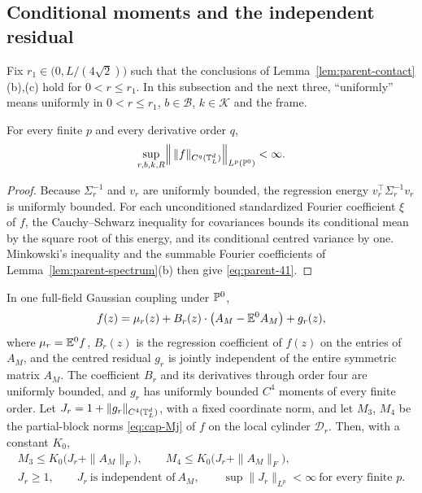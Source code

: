 \subsection{Conditional moments and the independent residual}\label{ssec:parent-residual}

Fix $r_1\in\bigl(0,L/(4\sqrt2)\bigr)$ such that the conclusions of Lemma~\ref{lem:parent-contact}(b),(c) hold for $0<r\le r_1$. In this subsection and the next three, ``uniformly'' means uniformly in $0<r\le r_1$, $b\in\mathcal B$, $k\in\mathcal K$ and the frame.

\begin{lemma}\label{lem:parent-moments}
For every finite $p$ and every derivative order $q$,
\begin{equation}\label{eq:parent-41}
\sup_{r,b,k,R}\Bigl\|\,\|f\|_{C^q(\mathbb T^d_L)}\Bigr\|_{L^p(\mathbb P^0)}<\infty .
\end{equation}
\end{lemma}

\begin{proof}
Because $\Sigma_r^{-1}$ and $v_r$ are uniformly bounded, the regression energy $v_r^{\top}\Sigma_r^{-1}v_r$ is uniformly bounded. For each unconditioned standardized Fourier coefficient $\xi$ of $f$, the Cauchy--Schwarz inequality for covariances bounds its conditional mean by the square root of this energy, and its conditional centred variance by one. Minkowski's inequality and the summable Fourier coefficients of Lemma~\ref{lem:parent-spectrum}(b) then give \eqref{eq:parent-41}.
\end{proof}

\begin{lemma}\label{lem:parent-residual}
In one full-field Gaussian coupling under $\mathbb P^0$,
\begin{equation}\label{eq:parent-42}
f(z)=\mu_r(z)+B_r(z)\cdot\bigl(A_M-\mathbb E^0A_M\bigr)+g_r(z),
\end{equation}
where $\mu_r=\mathbb E^0f$, $B_r(z)$ is the regression coefficient of $f(z)$ on the entries of $A_M$, and the centred residual $g_r$ is jointly independent of the entire symmetric matrix $A_M$. The coefficient $B_r$ and its derivatives through order four are uniformly bounded, and $g_r$ has uniformly bounded $C^4$ moments of every finite order. Let $J_r=1+\|g_r\|_{C^4(\mathbb T^d_L)}$, with a fixed coordinate norm, and let $M_3$, $M_4$ be the partial-block norms \eqref{eq:cap-Mj} of $f$ on the local cylinder $\mathcal D_r$. Then, with a constant $K_0$,
\begin{equation}\label{eq:parent-43}
\begin{gathered}
M_3\le K_0\bigl(J_r+\|A_M\|_F\bigr),\qquad M_4\le K_0\bigl(J_r+\|A_M\|_F\bigr),\\
J_r\ge1,\qquad J_r\ \text{is independent of}\ A_M,\qquad \sup\|J_r\|_{L^p}<\infty\ \text{for every finite }p .
\end{gathered}
\end{equation}
\end{lemma}

